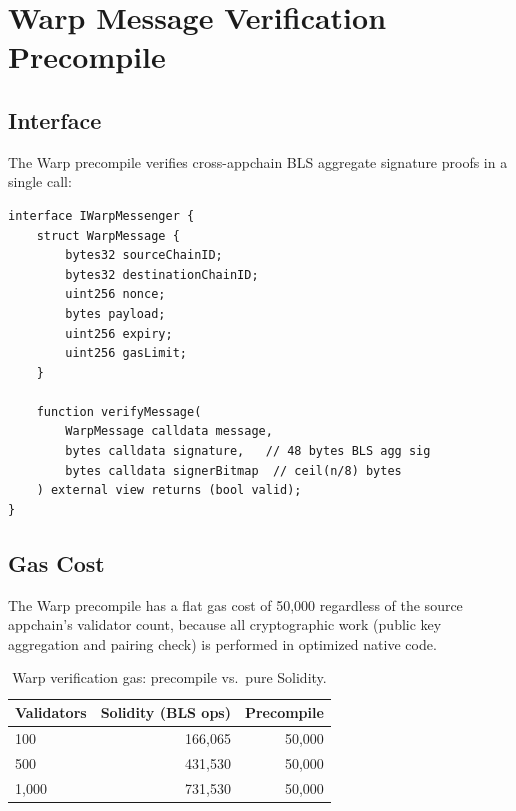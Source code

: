 \section{Warp Message Verification Precompile}
\label{sec:warp}

\subsection{Interface}

The Warp precompile verifies cross-appchain BLS aggregate signature proofs in a single call:

\begin{lstlisting}[language=Solidity,caption={Warp verification precompile interface.},label={lst:warp}]
interface IWarpMessenger {
    struct WarpMessage {
        bytes32 sourceChainID;
        bytes32 destinationChainID;
        uint256 nonce;
        bytes payload;
        uint256 expiry;
        uint256 gasLimit;
    }

    function verifyMessage(
        WarpMessage calldata message,
        bytes calldata signature,   // 48 bytes BLS agg sig
        bytes calldata signerBitmap  // ceil(n/8) bytes
    ) external view returns (bool valid);
}
\end{lstlisting}

\subsection{Gas Cost}

The Warp precompile has a flat gas cost of 50,000 regardless of the source appchain's validator count, because all cryptographic work (public key aggregation and pairing check) is performed in optimized native code.

\begin{table}[H]
\centering
\caption{Warp verification gas: precompile vs.\ pure Solidity.}
\label{tab:warp_gas}
\begin{tabular}{lrr}
\toprule
\textbf{Validators} & \textbf{Solidity (BLS ops)} & \textbf{Precompile} \\
\midrule
100 & 166,065 & 50,000 \\
500 & 431,530 & 50,000 \\
1,000 & 731,530 & 50,000 \\
\bottomrule
\end{tabular}
\end{table}

